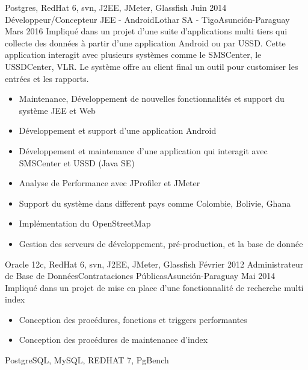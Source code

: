 \begin{experiences}
{                 }
                 {Postgres, RedHat 6, svn, J2EE, JMeter, Glassfish}
  \emptySeparator
  \projectexperiences
    {Juin 2014}  {Développeur/Concepteur JEE - Android}{Lothar SA - Tigo}{Asunción-Paraguay}
    {Mars 2016}
                 {Impliqué dans un projet d'une suite d'applications multi tiers qui collecte des données à partir
                 d'une application Android ou par USSD. Cette application interagit avec plusieurs systèmes comme
                 le SMSCenter, le USSDCenter, VLR. Le système offre au client final un outil pour customiser les
                 entrées et les rapports.
                  }
                 {
                      \begin{itemize}
                        \item Maintenance, Développement de nouvelles fonctionnalités et support du système JEE et Web
                        \item Développement et support d'une application Android
                        \item Développement et maintenance d’une application qui interagit avec SMSCenter et USSD (Java SE)
                        \item Analyse de Performance avec JProfiler et JMeter
                        \item Support du système dans different pays comme Colombie, Bolivie, Ghana
                        \item Implémentation du OpenStreetMap
                        \item Gestion des serveurs de développement, pré-production, et la base de donnée
                      \end{itemize}
				         }
                 {Oracle 12c, RedHat 6, svn, J2EE, JMeter, Glassfish}
  \emptySeparator
  \projectexperiences
    {Février 2012}   {Administrateur de Base de Données}{Contrataciones Públicas}{Asunción-Paraguay}
    {Mai 2014}      {
                      Impliqué dans un projet de mise en place d'une fonctionnalité de recherche multi index
                    }
                    {
                      \begin{itemize}
                        \item Conception des procédures, fonctions et triggers performantes
                        \item Conception des procédures de maintenance d'index
                      \end{itemize}
                    }
                {PostgreSQL, MySQL, REDHAT 7, PgBench}

\end{experiences}
